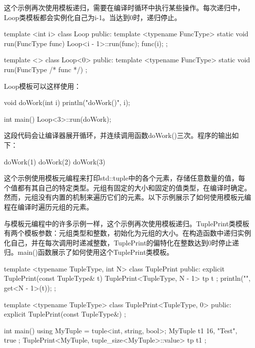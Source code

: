 这个示例再次使用模板递归，需要在编译时循环中执行某些操作。每次递归中，Loop类模板都会实例化自己为i-1。当达到0时，递归停止。

\begin{cpp}
template <int i>
class Loop
{
    public:
        template <typename FuncType>
        static void run(FuncType func) {
            Loop<i - 1>::run(func);
            func(i);
        }
};

template <>
class Loop<0>
{
    public:
        template <typename FuncType>
        static void run(FuncType /* func */) { }
};
\end{cpp}

Loop模板可以这样使用：

\begin{cpp}
void doWork(int i) { println("doWork({})", i); }

int main()
{
    Loop<3>::run(doWork);
}
\end{cpp}

这段代码会让编译器展开循环，并连续调用函数doWork()三次。程序的输出如下：

\begin{shell}
doWork(1)
doWork(2)
doWork(3)
\end{shell}


这个示例使用模板元编程来打印std::tuple中的各个元素，存储任意数量的值，每个值都有其自己的特定类型。元组有固定的大小和固定的值类型，在编译时确定。然而，元组没有内置的机制来遍历它们的元素。以下示例展示了如何使用模板元编程在编译时遍历元组的元素。

与模板元编程中的许多示例一样，这个示例再次使用模板递归。TuplePrint类模板有两个模板参数：元组类型和整数，初始化为元组的大小。在构造函数中递归实例化自己，并在每次调用时递减整数，TuplePrint的偏特化在整数达到0时停止递归。main()函数展示了如何使用这个TuplePrint类模板。

\begin{cpp}
template <typename TupleType, int N>
class TuplePrint
{
    public:
        explicit TuplePrint(const TupleType& t) {
            TuplePrint<TupleType, N - 1> tp { t };
            println("{}", get<N - 1>(t));
        }
};

template <typename TupleType>
class TuplePrint<TupleType, 0>
{
    public:
        explicit TuplePrint(const TupleType&) { }
};

int main()
{
    using MyTuple = tuple<int, string, bool>;
    MyTuple t1 { 16, "Test", true };
    TuplePrint<MyTuple, tuple_size<MyTuple>::value> tp { t1 };
}
\end{cpp}

